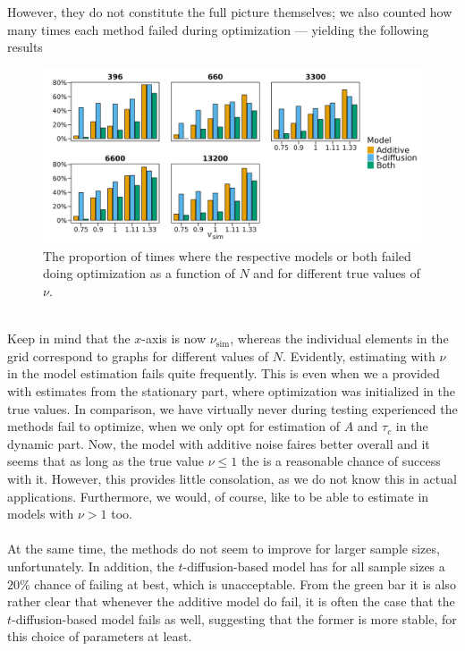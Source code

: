 \newpage 
\noindent However, they do not constitute the full picture themselves; we also counted how many times each method failed during optimization — yielding the following results
\begin{figure}[h!]
    \begin{center}
        \includegraphics[scale = .1]{figures/error_count_plot.jpeg}
        \caption{The proportion of times where the respective models or both failed doing optimization as a function of $N$ and for different true values of $\nu$.}
        \label{figure:error_count_nu_experiment}
    \end{center}
\end{figure}\\
Keep in mind that the $x$-axis is now $\nu_{\mathrm{sim}}$, whereas the individual elements in the grid correspond to graphs for different values of $N$. Evidently, estimating with $\nu$ in the model estimation fails quite frequently. This is even when we a provided with estimates from the stationary part, where optimization was initialized in the true values. In comparison, we have virtually never during testing experienced the methods fail to optimize, when we only opt for estimation of $A$ and $\tau_c$ in the dynamic part. Now, the model with additive noise faires better overall and it seems that as long as the true value $\nu\leq 1$ the is a reasonable chance of success with it. However, this provides little consolation, as we do not know this in actual applications. Furthermore, we would, of course, like to be able to estimate in models with $\nu > 1$ too.\\\\
At the same time, the methods do not seem to improve for larger sample sizes, unfortunately. In addition, the $t$-diffusion-based model has for all sample sizes a $20\%$ chance of failing at best, which is unacceptable. From the green bar it is also rather clear that whenever the additive model do fail, it is often the case that the $t$-diffusion-based model fails as well, suggesting that the former is more stable, for this choice of parameters at least.
